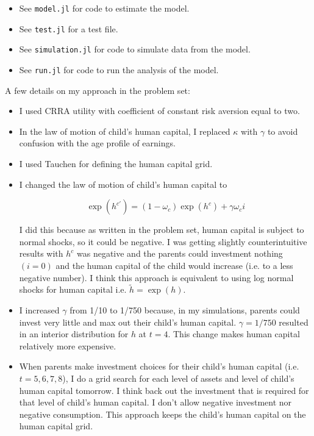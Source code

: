 \documentclass{article}
\begin{document}
\begin{enumerate}
\begin{itemize}
\item See \texttt{model.jl} for code to estimate the model.

\item See \texttt{test.jl} for a test file.

\item See \texttt{simulation.jl} for code to simulate data from the model.

\item See \texttt{run.jl} for code to run the analysis of the model.

\end{itemize}

A few details on my approach in the problem set:

\begin{itemize}

\item I used CRRA utility with coefficient of constant risk aversion equal to two.

\item In the law of motion of child's human capital, I replaced $\kappa$ with $\gamma$ to avoid confusion with the age profile of earnings.

\item I used Tauchen for defining the human capital grid.

\item I changed the law of motion of child's human capital to 

$$
\exp(h^{c'}) = (1 - \omega_c) \exp(h^c) + \gamma \omega_c i
$$

I did this because as written in the problem set, human capital is subject to normal shocks, so it could be negative.  I was getting slightly counterintuitive results with $h^c$ was negative and the parents could investment nothing $(i = 0)$ and the human capital of the child would increase (i.e. to a less negative number). I think this approach is equivalent to using log normal shocks for human capital i.e. $\tilde{h} = \exp(h)$.

\item I increased $\gamma$ from 1/10 to 1/750 because, in my simulations, parents could invest very little and max out their child's human capital.  $\gamma = 1/750$ resulted in an interior distribution for $h$ at $t=4$.  This change makes human capital relatively more expensive.

\item When parents make investment choices for their child's human capital (i.e. $t=5, 6, 7, 8$), I do a grid search for each level of assets and level of child's human capital tomorrow.  I think back out the investment that is required for that level of child's human capital.  I don't allow negative investment nor negative consumption.  This approach keeps the child's human capital on the human capital grid.


\end{itemize}
\end{enumerate}
\end{document}
